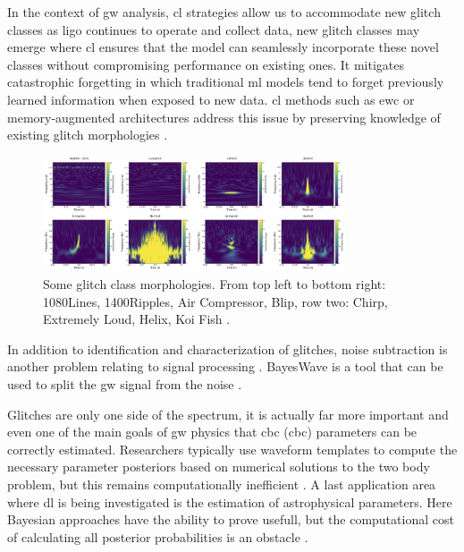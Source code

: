 In the context of \acrshort{gw} analysis, \acrshort{cl} strategies allow us to accommodate new glitch classes as \acrshort{ligo} continues to operate and collect data, new glitch classes may emerge where \acrshort{cl} ensures that the model can seamlessly incorporate these novel classes without compromising performance on existing ones. It mitigates catastrophic forgetting in which traditional \acrshort{ml} models tend to forget previously learned information when exposed to new data. \acrshort{cl} methods such as \acrfull{ewc} or memory-augmented architectures address this issue by preserving knowledge of existing glitch morphologies \citep{abbott2023open, kirkpatrick2017overcoming}.  

\begin{figure}[H]
    \centering
    \includegraphics[width=0.8\textwidth]{Images/glitch_morphologies.jpg}
    \caption{Some glitch class morphologies. From top left to bottom right: 1080Lines, 1400Ripples, Air Compressor, Blip, row two: Chirp, Extremely Loud, Helix, Koi Fish \citep{glanzer2023data}.}
    \label{fig:glitch_morphologies}
\end{figure}

In addition to identification and characterization of glitches, noise subtraction is another problem relating to signal processing \citep{benedetto2023ai, ormiston2020noise, davis2022detector, cornish2021bayeswave}. BayesWave is a tool that can be used to split the \acrshort{gw} signal from the noise \citep{cornish2021bayeswave}.

Glitches are only one side of the spectrum, it is actually far more important and even one of the main goals of \acrshort{gw} physics that \acrlong{cbc} (\acrshort{cbc}) parameters can be correctly estimated. Researchers typically use waveform templates to compute the necessary parameter posteriors based on numerical solutions to the two body problem, but this remains computationally inefficient \citep{ajith2011addressing,coogan2022efficient,isoyama2020post}.
A last application area where \acrshort{dl} is being investigated is the estimation of astrophysical parameters. Here Bayesian approaches have the ability to prove usefull, but the computational cost of calculating all posterior probabilities is an obstacle \citep{cuoco2020enhancing}.

